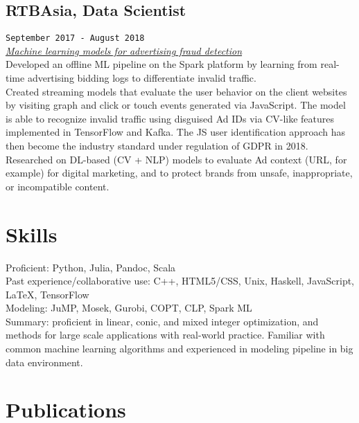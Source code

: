 \documentclass[10pt, letter]{article}
\begin{document}
\subsection{RTBAsia, Data Scientist}
\texttt{September 2017 - August 2018} \\
\underline{\textit{Machine learning models for advertising fraud
detection}} \\
\bullet\quad Developed an offline ML pipeline on the Spark platform by
learning from real-time advertising bidding logs to differentiate
invalid traffic. \\
\bullet\quad Created streaming models that evaluate the user behavior on
the client websites by visiting graph and click or touch events
generated via JavaScript. The model is able to recognize invalid traffic
using disguised Ad IDs via CV-like features implemented in TensorFlow
and Kafka. The JS user identification approach has then become the
industry standard under regulation of GDPR in 2018. \\
\bullet\quad Researched on DL-based (CV + NLP) models to evaluate Ad
context (URL, for example) for digital marketing, and to protect brands
from unsafe, inappropriate, or incompatible content. \\

\section{Skills}

Proficient: Python, Julia, Pandoc, Scala\\[.15cm]
Past experience/collaborative use: C++, HTML5/CSS, Unix, Haskell,
JavaScript, LaTeX, TensorFlow\\[.15cm]
Modeling: JuMP, Mosek, Gurobi, COPT, CLP, Spark ML\\[.15cm]
Summary: proficient in linear, conic, and mixed integer optimization,
and methods for large scale applications with real-world practice.
Familiar with common machine learning algorithms and experienced in
modeling pipeline in big data environment.\\[.15cm]

\section{Publications}
\cite{zhang2017controlling} \\[.15cm]
\end{document}
